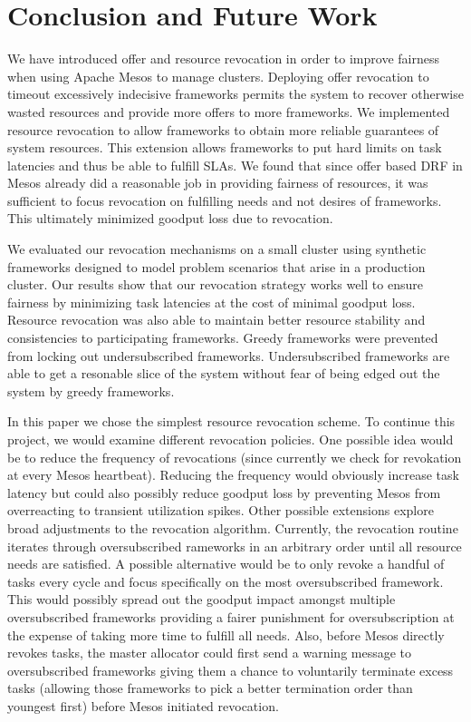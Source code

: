 \section{Conclusion and Future Work}
We have introduced offer and resource revocation in order to improve fairness when using Apache Mesos
to manage clusters. Deploying offer revocation to timeout excessively indecisive frameworks permits the
system to recover otherwise wasted resources and provide more offers to more frameworks. We implemented
resource revocation to allow frameworks to obtain more reliable guarantees of system resources. This
extension allows frameworks to put hard limits on task latencies and thus be able to fulfill SLAs. We
found that since offer based DRF in Mesos already did a reasonable job in providing fairness of
resources, it was sufficient to focus revocation on fulfilling needs and not desires of frameworks. This
ultimately minimized goodput loss due to revocation.

We evaluated our revocation mechanisms on a small cluster using synthetic frameworks designed to model
problem scenarios that arise in a production cluster. Our results show that our revocation strategy
works well to ensure fairness by minimizing task latencies at the cost of minimal goodput loss. Resource
revocation was also able to maintain better resource stability and consistencies to participating
frameworks. Greedy frameworks were prevented from locking out undersubscribed frameworks.
Undersubscribed frameworks are able to get a resonable slice of the system without fear of being edged
out the system by greedy frameworks.

In this paper we chose the simplest resource revocation scheme. To continue this project, we would
examine different revocation policies. One possible idea would be to reduce the frequency of revocations
(since currently we check for revokation at every Mesos heartbeat). Reducing the frequency would
obviously increase task latency but could also possibly reduce goodput loss by preventing Mesos from
overreacting to transient utilization spikes. Other possible extensions explore broad adjustments to the
revocation algorithm. Currently, the revocation routine iterates through oversubscribed rameworks in an
arbitrary order until all resource needs are satisfied. A possible alternative would be to only revoke a
handful of tasks every cycle and focus specifically on the most oversubscribed framework. This would
possibly spread out the goodput impact amongst multiple oversubscribed frameworks providing a fairer
punishment for oversubscription at the expense of taking more time to fulfill all needs. Also, before
Mesos directly revokes tasks, the master allocator could first send a warning message to oversubscribed
frameworks giving them a chance to voluntarily terminate excess tasks (allowing those frameworks to pick
a better termination order than youngest first) before Mesos initiated revocation.
